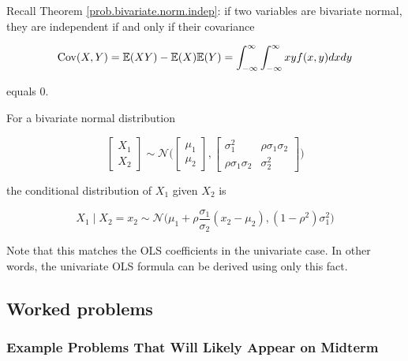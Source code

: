 Recall Theorem \ref{prob.bivariate.norm.indep}: if two variables are bivariate normal, they are independent if and only if their covariance 

\[
\Cov(X, Y) = \E(XY) - \E(X)\E(Y) = \int_{-\infty}^\infty \int_{-\infty}^\infty xy f(x, y) dx dy
\] 

equals 0. 

\begin{theorem}\label{prob.cond.bivar.norm.dist}For a bivariate normal distribution

\[
\begin{bmatrix} X_1 \\ X_2 \end{bmatrix}  \sim \mathcal{N}\bigg(\begin{bmatrix} \mu_1 \\ \mu_2 \end{bmatrix}, \begin{bmatrix} \sigma_1^2 & \rho \sigma_1 \sigma_2 \\  \rho \sigma_1 \sigma_2 & \sigma_2^2 \end{bmatrix}  \bigg)
\]

the conditional distribution of \(X_1\) given \(X_2\) is

\[
X_1 \mid X_2 = x_2 \sim \mathcal{N} \bigg( \mu_1 + \rho \frac{\sigma_1}{\sigma_2}(x_2 - \mu_2), (1 - \rho^2)\sigma_1^2 \bigg) 
\]

\end{theorem}

\begin{remark}Note that this matches the OLS coefficients in the univariate case. In other words, the univariate OLS formula can be derived using only this fact.\end{remark}


%
%
%
%
%
%
%
\subsection{Worked problems}

\subsubsection{Example Problems That Will Likely Appear on Midterm}

